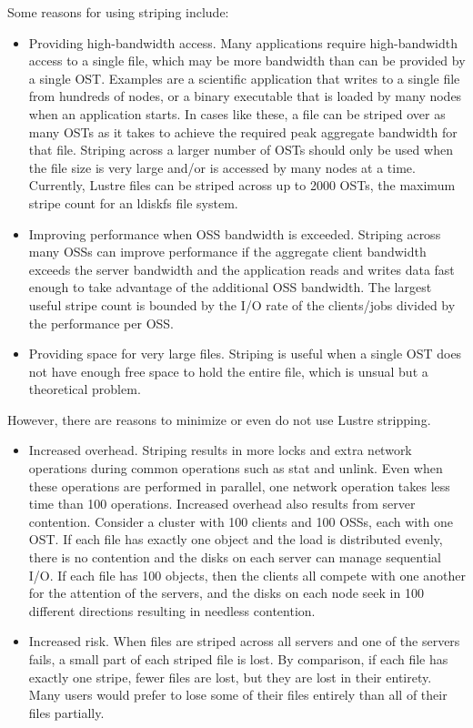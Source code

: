 \documentclass{article}
\begin{document}
Some reasons for using striping include:
\begin{itemize}
    \item Providing high-bandwidth access. Many applications require high-bandwidth access to a single file, which may be more bandwidth than can be provided by a single OST. Examples are a scientific application that writes to a single file from hundreds of nodes, or a binary executable that is loaded by many nodes when an application starts. In cases like these, a file can be striped over as many OSTs as it takes to achieve the required peak aggregate bandwidth for that file. Striping across a larger number of OSTs should only be used when the file size is very large and/or is accessed by many nodes at a time. Currently, Lustre files can be striped across up to 2000 OSTs, the maximum stripe count for an ldiskfs file system.
    \item Improving performance when OSS bandwidth is exceeded. Striping across many OSSs can improve performance if the aggregate client bandwidth exceeds the server bandwidth and the application reads and writes data fast enough to take advantage of the additional OSS bandwidth. The largest useful stripe count is bounded by the I/O rate of the clients/jobs divided by the performance per OSS.
    \item Providing space for very large files. Striping is useful when a single OST does not have enough free space to hold the entire file, which is unsual but a theoretical problem.
\end{itemize}

However, there are reasons to minimize or even do not use Lustre stripping.
\begin{itemize}
    \item Increased overhead. Striping results in more locks and extra network operations during common operations such as stat and unlink. Even when these operations are performed in parallel, one network operation takes less time than 100 operations. Increased overhead also results from server contention. Consider a cluster with 100 clients and 100 OSSs, each with one OST. If each file has exactly one object and the load is distributed evenly, there is no contention and the disks on each server can manage sequential I/O. If each file has 100 objects, then the clients all compete with one another for the attention of the servers, and the disks on each node seek in 100 different directions resulting in needless contention.
    \item Increased risk. When files are striped across all servers and one of the servers fails, a small part of each striped file is lost. By comparison, if each file has exactly one stripe, fewer files are lost, but they are lost in their entirety. Many users would prefer to lose some of their files entirely than all of their files partially.
\end{itemize}
\end{document}
